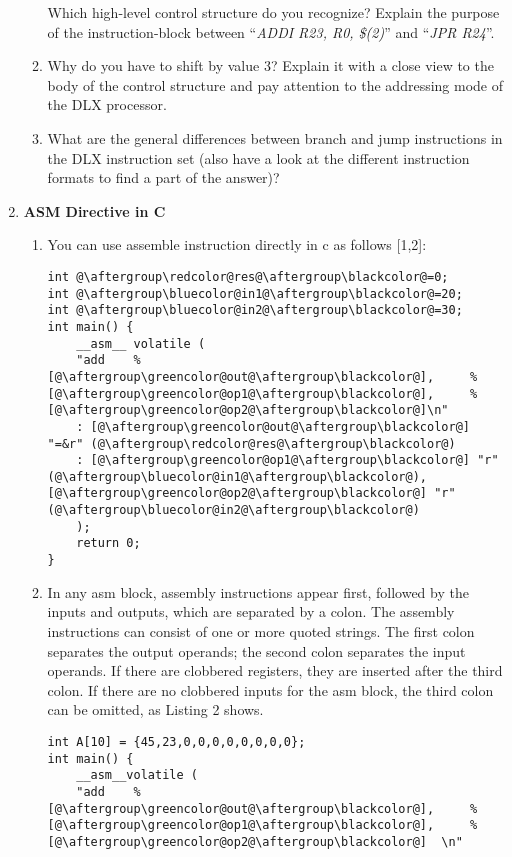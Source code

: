 \begin{enumerate}[start=0]
\begin{enumerate}[label=(\alph*)]
	Which high-level control structure do you recognize? Explain the
	purpose of the instruction-block between ``\emph{ADDI R23, R0,
		\$(2)}'' and ``\emph{JPR R24}''.
	\color{red}\item\normalcolor
	Why do you have to shift by value 3? Explain it with a close view to
	the body of the control structure and pay attention to the addressing
	mode of the DLX processor.
	\color{red}\item\normalcolor
	What are the general differences between branch and jump instructions
	in the DLX instruction set (also have a look at the different
	instruction formats to find a part of the answer)?
	\end{enumerate}
\item \textbf{ASM Directive in C}
	\begin{enumerate}
	\item You can use assemble instruction directly in c as follows {[}1,2{]}:
	\begin{lstlisting}
int @\aftergroup\redcolor@res@\aftergroup\blackcolor@=0;
int @\aftergroup\bluecolor@in1@\aftergroup\blackcolor@=20;
int @\aftergroup\bluecolor@in2@\aftergroup\blackcolor@=30;
int main() {
	__asm__ volatile (
	"add 	%[@\aftergroup\greencolor@out@\aftergroup\blackcolor@], 	%[@\aftergroup\greencolor@op1@\aftergroup\blackcolor@], 	%[@\aftergroup\greencolor@op2@\aftergroup\blackcolor@]\n"
	: [@\aftergroup\greencolor@out@\aftergroup\blackcolor@] "=&r" (@\aftergroup\redcolor@res@\aftergroup\blackcolor@)
	: [@\aftergroup\greencolor@op1@\aftergroup\blackcolor@] "r" (@\aftergroup\bluecolor@in1@\aftergroup\blackcolor@),[@\aftergroup\greencolor@op2@\aftergroup\blackcolor@] "r" (@\aftergroup\bluecolor@in2@\aftergroup\blackcolor@)
	);
	return 0;
}
	\end{lstlisting}
	\item
	In any asm block, assembly instructions appear first, followed by the
	inputs and outputs, which are separated by a colon. The assembly
	instructions can consist of one or more quoted strings. The first
	colon separates the output operands; the second colon separates the
	input operands. If there are clobbered registers, they are inserted
	after the third colon. If there are no clobbered inputs for the asm
	block, the third colon can be omitted, as Listing 2 shows.
	\begin{lstlisting}
int A[10] = {45,23,0,0,0,0,0,0,0,0};
int main() {
	__asm__volatile (
	"add 	%[@\aftergroup\greencolor@out@\aftergroup\blackcolor@], 	%[@\aftergroup\greencolor@op1@\aftergroup\blackcolor@], 	%[@\aftergroup\greencolor@op2@\aftergroup\blackcolor@]	\n"

\end{lstlisting}
\end{enumerate}
\end{enumerate}
